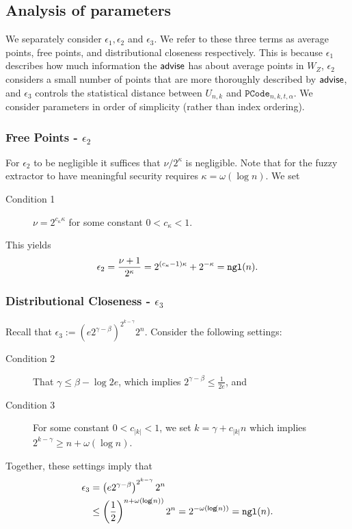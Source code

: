 \subsection{Analysis of parameters}
\label{ssec:analysis params}
We separately consider $\epsilon_1, \epsilon_2$ and $\epsilon_3$. We refer to these three terms as average points, free points, and distributional closeness respectively. This is because $\epsilon_1$ describes how much information the ${\mathsf{advise}}$ has about average points in $W_Z$, $\epsilon_2$ considers a small number of points that are more thoroughly described by ${\mathsf{advise}}$, and $\epsilon_3$ controls the statistical distance between $U_{n, k}$ and $\mathtt{PCode}_{n, k, t, \alpha}$.  We consider parameters in order of simplicity (rather than index ordering).



\subsubsection{Free Points - $\epsilon_2$}
For $\epsilon_2$ to be negligible it suffices that $\nu/2^\kappa$ is negligible.  Note that for the fuzzy extractor to have meaningful security requires $\kappa = \omega(\log{n})$.  We set
\begin{description}
\item[Condition 1] $\nu = 2^{c_{\kappa}\kappa}$ for some constant $0 < c_{\kappa}<1$.
\end{description} 
This yields 
\[
\epsilon_2= \frac{\nu+1}{2^\kappa} = 2^{(c_{\kappa}-1)\kappa}+ 2^{-\kappa} = \mathtt{ngl}(n).
\]
\subsubsection{Distributional Closeness - $\epsilon_3$}
Recall that $\epsilon_3:=\left(e2^{\gamma-\beta}\right)^{2^{k-\gamma}}2^n$.  Consider the following settings:
\begin{description}
\item[Condition 2] That $\gamma\le \beta-\log{2e}$, which implies $2^{\gamma - \beta} \le \frac{1}{2e}$, and 
\item[Condition 3] For some constant $0<c_{|k|} < 1$, we set $k = \gamma + c_{|k|}n$ which implies $2^{k-\gamma}\ge n+\omega(\log{n})$. 
\end{description}
Together, these settings imply that 
\begin{align*}
\epsilon_3&=\left(e2^{\gamma-\beta}\right)^{2^{k-\gamma}}2^n\\
&\le\left(\frac{1}{2}\right)^{n+\omega(\mathsf{log}\!\left(n\right))}2^n= 2^{-\omega(\mathsf{log}\!\left(n\right))} = \mathtt{ngl}(n).
\end{align*}

